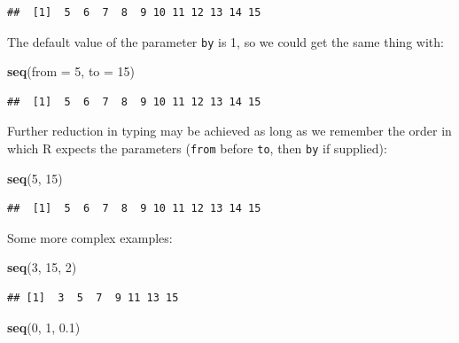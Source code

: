 \documentclass[]{book}
\makeatletter
\newenvironment{Shaded}{\begin{snugshade}}{\end{snugshade}}
\newcommand{\KeywordTok}[1]{\textcolor[rgb]{0.13,0.29,0.53}{\textbf{#1}}}
\newcommand{\DataTypeTok}[1]{\textcolor[rgb]{0.13,0.29,0.53}{#1}}
\newcommand{\DecValTok}[1]{\textcolor[rgb]{0.00,0.00,0.81}{#1}}
\newcommand{\FloatTok}[1]{\textcolor[rgb]{0.00,0.00,0.81}{#1}}
\newcommand{\NormalTok}[1]{#1}
\newenvironment{kframe}{%
\medskip{}
\setlength{\fboxsep}{.8em}
 \def\at@end@of@kframe{}%
 \ifinner\ifhmode%
  \def\at@end@of@kframe{\end{minipage}}%
  \begin{minipage}{\columnwidth}%
 \fi\fi%
 \def\FrameCommand##1{\hskip\@totalleftmargin \hskip-\fboxsep
 \colorbox{shadecolor}{##1}\hskip-\fboxsep
     \hskip-\linewidth \hskip-\@totalleftmargin \hskip\columnwidth}%
 \MakeFramed {\advance\hsize-\width
   \@totalleftmargin\z@ \linewidth\hsize
   \@setminipage}}%
 {\par\unskip\endMakeFramed%
 \at@end@of@kframe}
\renewenvironment{Shaded}{\begin{kframe}}{\end{kframe}}
\theoremstyle{definition}
\theoremstyle{definition}
\theoremstyle{definition}
\theoremstyle{remark}
\makeatother
\begin{document}
\begin{verbatim}
##  [1]  5  6  7  8  9 10 11 12 13 14 15
\end{verbatim}

The default value of the parameter \texttt{by} is 1, so we could get the
same thing with:

\begin{Shaded}
\begin{Highlighting}[]
\KeywordTok{seq}\NormalTok{(}\DataTypeTok{from =} \DecValTok{5}\NormalTok{, }\DataTypeTok{to =} \DecValTok{15}\NormalTok{)}
\end{Highlighting}
\end{Shaded}

\begin{verbatim}
##  [1]  5  6  7  8  9 10 11 12 13 14 15
\end{verbatim}

Further reduction in typing may be achieved as long as we remember the
order in which R expects the parameters (\texttt{from} before
\texttt{to}, then \texttt{by} if supplied):

\begin{Shaded}
\begin{Highlighting}[]
\KeywordTok{seq}\NormalTok{(}\DecValTok{5}\NormalTok{, }\DecValTok{15}\NormalTok{)}
\end{Highlighting}
\end{Shaded}

\begin{verbatim}
##  [1]  5  6  7  8  9 10 11 12 13 14 15
\end{verbatim}

Some more complex examples:

\begin{Shaded}
\begin{Highlighting}[]
\KeywordTok{seq}\NormalTok{(}\DecValTok{3}\NormalTok{, }\DecValTok{15}\NormalTok{, }\DecValTok{2}\NormalTok{)}
\end{Highlighting}
\end{Shaded}

\begin{verbatim}
## [1]  3  5  7  9 11 13 15
\end{verbatim}

\begin{Shaded}
\begin{Highlighting}[]
\KeywordTok{seq}\NormalTok{(}\DecValTok{0}\NormalTok{, }\DecValTok{1}\NormalTok{, }\FloatTok{0.1}\NormalTok{)}
\end{Highlighting}
\end{Shaded}
\end{document}

